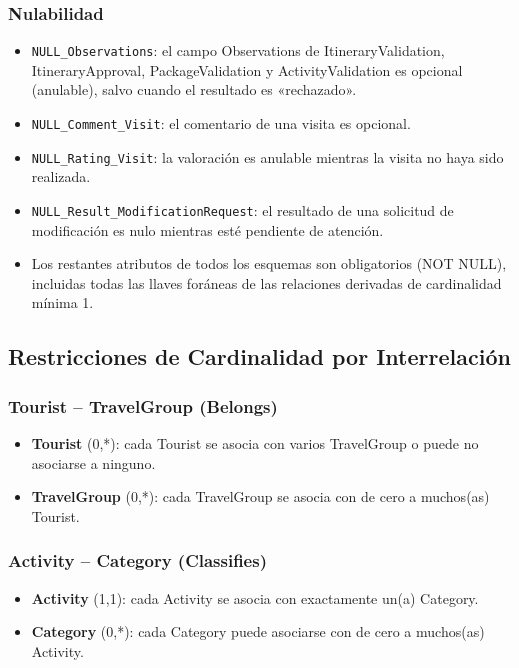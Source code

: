 \documentclass[11pt,a4paper]{article}
\begin{document}
\subsubsection*{Nulabilidad}
\begin{itemize}[leftmargin=1.2em,itemsep=2pt,topsep=3pt]
\item \texttt{NULL\_\allowbreak{}Observations}: el campo Observations de ItineraryValidation, ItineraryApproval, PackageValidation y ActivityValidation es opcional (anulable), salvo cuando el resultado es «rechazado».
\item \texttt{NULL\_\allowbreak{}Comment\_\allowbreak{}Visit}: el comentario de una visita es opcional.
\item \texttt{NULL\_\allowbreak{}Rating\_\allowbreak{}Visit}: la valoración es anulable mientras la visita no haya sido realizada.
\item \texttt{NULL\_\allowbreak{}Result\_\allowbreak{}ModificationRequest}: el resultado de una solicitud de modificación es nulo mientras esté pendiente de atención.
\item Los restantes atributos de todos los esquemas son obligatorios (NOT NULL), incluidas todas las llaves foráneas de las relaciones derivadas de cardinalidad mínima 1.
\end{itemize}
\subsection{Restricciones de Cardinalidad por Interrelación}
\subsubsection{Tourist – TravelGroup (Belongs)}
\begin{itemize}[leftmargin=1.2em,itemsep=2pt,topsep=3pt]
\item \textbf{Tourist} (0,*): cada Tourist se asocia con varios TravelGroup o puede no asociarse a ninguno.
\item \textbf{TravelGroup} (0,*): cada TravelGroup se asocia con de cero a muchos(as) Tourist.
\end{itemize}
\subsubsection{Activity – Category (Classifies)}
\begin{itemize}[leftmargin=1.2em,itemsep=2pt,topsep=3pt]
\item \textbf{Activity} (1,1): cada Activity se asocia con exactamente un(a) Category.
\item \textbf{Category} (0,*): cada Category puede asociarse con de cero a muchos(as) Activity.
\end{itemize}
\end{document}
